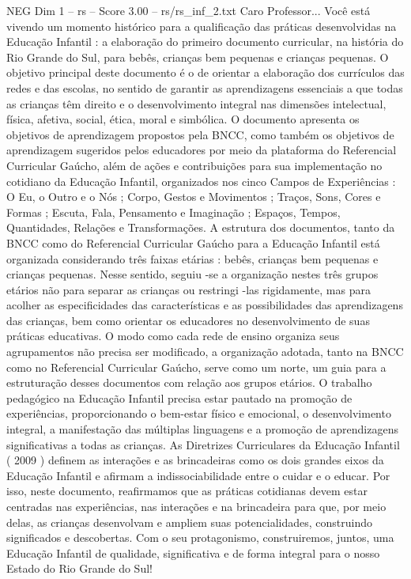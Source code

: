 \begin{textsample}{NEG Dim 1 – rs – Score 3.00 – rs/rs\_inf\_2.txt}  \label{ex:f1_neg_089}
Caro Professor...
Você está vivendo um momento histórico para a qualificação das práticas desenvolvidas na Educação Infantil : a elaboração do primeiro documento curricular, na história do Rio Grande do Sul, para bebês, crianças bem pequenas e crianças pequenas.
O objetivo principal deste documento é o de orientar a elaboração dos currículos das redes e das escolas, no sentido de garantir as aprendizagens essenciais a que todas as crianças têm direito e o desenvolvimento integral nas dimensões intelectual, física, afetiva, social, ética, moral e simbólica.
O documento apresenta os objetivos de aprendizagem propostos pela BNCC, como também os objetivos de aprendizagem sugeridos pelos educadores por meio da plataforma do Referencial Curricular Gaúcho, além de ações e contribuições para sua implementação no cotidiano da Educação Infantil, organizados nos cinco Campos de Experiências : O Eu, o Outro e o Nós ; Corpo, Gestos e Movimentos ; Traços, Sons, Cores e Formas ; Escuta, Fala, Pensamento e Imaginação ; Espaços, Tempos, Quantidades, Relações e Transformações.
A estrutura dos documentos, tanto da BNCC como do Referencial Curricular Gaúcho para a Educação Infantil está organizada considerando três faixas etárias : bebês, crianças bem pequenas e crianças pequenas.
Nesse sentido, seguiu -se a organização nestes três grupos etários não para separar as crianças ou restringi -las rigidamente, mas para acolher as especificidades das características e as possibilidades das aprendizagens das crianças, bem como orientar os educadores no desenvolvimento de suas práticas educativas.
O modo como cada rede de ensino organiza seus agrupamentos não precisa ser modificado, a organização adotada, tanto na BNCC como no Referencial Curricular Gaúcho, serve como um norte, um guia para a estruturação desses documentos com relação aos grupos etários.
O trabalho pedagógico na Educação Infantil precisa estar pautado na promoção de experiências, proporcionando o bem-estar físico e emocional, o desenvolvimento integral, a manifestação das múltiplas linguagens e a promoção de aprendizagens significativas a todas as crianças.
As Diretrizes Curriculares da Educação Infantil ( 2009 ) definem as interações e as brincadeiras como os dois grandes eixos da Educação Infantil e afirmam a indissociabilidade entre o cuidar e o educar.
Por isso, neste documento, reafirmamos que as práticas cotidianas devem estar centradas nas experiências, nas interações e na brincadeira para que, por meio delas, as crianças desenvolvam e ampliem suas potencialidades, construindo significados e descobertas.
Com o seu protagonismo, construiremos, juntos, uma Educação Infantil de qualidade, significativa e de forma integral para o nosso Estado do Rio Grande do Sul!

\end{textsample}
